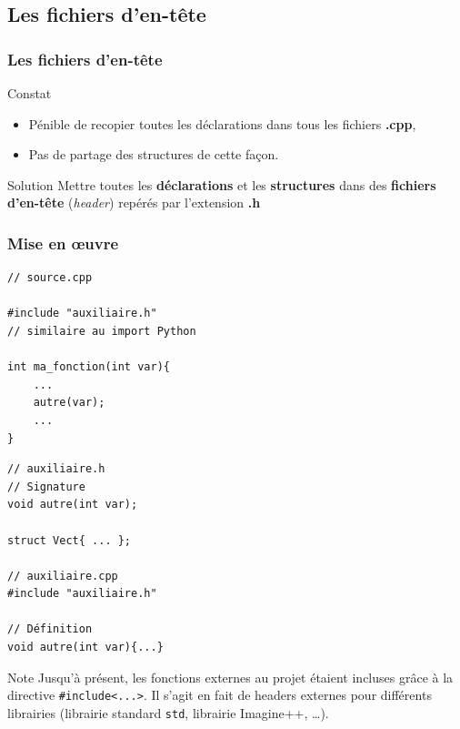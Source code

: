 \subsection{Les fichiers d'en-tête}

\begin{frame}
\frametitle{Les fichiers d'en-tête}

\begin{exampleblock}{Constat}
\begin{itemize}
    \item Pénible de recopier toutes les déclarations dans tous les fichiers \textbf{.cpp},
    \item Pas de partage des structures de cette façon.
\end{itemize}
\end{exampleblock}

\begin{block}{Solution}
    Mettre toutes les \textbf{déclarations} et les \textbf{structures} dans des \textbf{fichiers d'en-tête} (\textit{header}) repérés par l'extension \textbf{.h}
\end{block}
\end{frame}

\begin{frame}[fragile=singleslide]
\frametitle{Mise en \oe{}uvre}

\begin{minipage}{0.49\textwidth}
\begin{verbatim}
// source.cpp

#include "auxiliaire.h"
// similaire au import Python

int ma_fonction(int var){
    ...
    autre(var);
    ...
}
\end{verbatim}
\end{minipage}
\begin{minipage}{0.48\textwidth}
\begin{verbatim}
// auxiliaire.h
// Signature
void autre(int var);

struct Vect{ ... };

// auxiliaire.cpp
#include "auxiliaire.h"

// Définition
void autre(int var){...}
\end{verbatim}
\end{minipage}

\begin{block}{Note}
Jusqu'à présent, les fonctions externes au projet étaient incluses grâce à la directive \texttt{\#include<...>}. Il s'agit en fait de headers externes pour différents librairies (librairie standard \texttt{std}, librairie Imagine++, \dots).
\end{block}

\end{frame}

